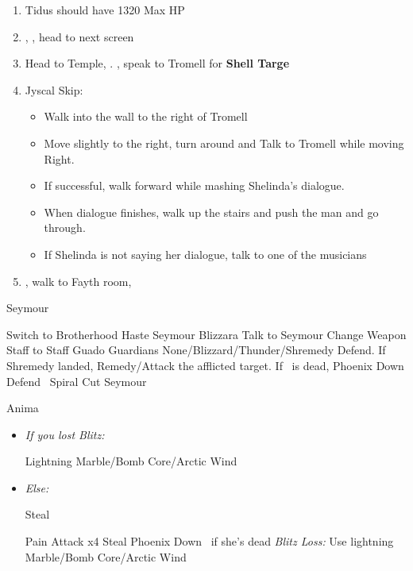 \begin{enumerate}[resume]
  \item Tidus should have 1320 Max HP
  \item \sd, \cs[0:40], head to next screen
  \item Head to Temple, \sd. \save, speak to Tromell for \textbf{Shell Targe}
  \item Jyscal Skip:
        \begin{itemize}
          \item Walk into the wall to the right of Tromell
          \item Move slightly to the right, turn around and Talk to Tromell while moving Right.
          \item If successful, walk forward while mashing Shelinda's dialogue.
          \item When dialogue finishes, walk up the stairs and push the man and go through.
          \item If Shelinda is not saying her dialogue, talk to one of the musicians
        \end{itemize}
  \item \sd, walk to Fayth room, \cs[2:10]
\end{enumerate}
\begin{battle}[3000]{Seymour}
  \begin{itemize}
    \tidusf Switch to Brotherhood
    \tidusf Haste \tidus
    \enemyf Seymour Blizzara
    \tidusf Talk to Seymour
    \yunaf Change Weapon Staff to Staff
    \enemyf Guado Guardians None/Blizzard/Thunder/Shremedy
    \kimahrif Defend. If Shremedy landed, Remedy/Attack the afflicted target. If \yuna\ is dead, Phoenix Down
    \switch{\yuna}{\auron}
    \auronf Defend
    \tidusf \od\ Spiral Cut Seymour
  \end{itemize}
\end{battle}
\begin{battle}[18000]{Anima}
  \begin{itemize}
    \switch{\tidus}{\wakka}
    \wakkaf Change Weapon
    \item \textit{If you lost Blitz:}
          \begin{itemize}
            \kimahrif Lightning Marble/Bomb Core/Arctic Wind
          \end{itemize}
    \item \textit{Else:}
          \begin{itemize}
            \kimahrif Steal
          \end{itemize}
          \enemyf Pain
          \tidusf Attack x4
          \rikkuf Steal
          \rikkuf Phoenix Down \yuna\ if she's dead
          \rikkuf \textit{Blitz Loss:} Use lightning Marble/Bomb Core/Arctic Wind
  \end{itemize}
\end{battle}

